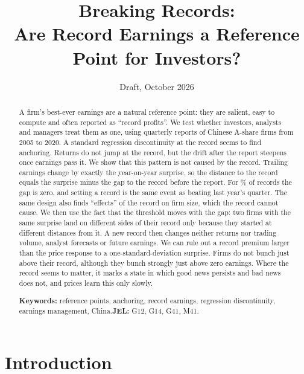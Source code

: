 \documentclass[11pt]{article}
\title{\textbf{Breaking Records:\\ Are Record Earnings a Reference Point for Investors?}}
\author{}
\date{Draft, October 2026}
\begin{document}
\maketitle
\vspace{-2em}
\begin{abstract}
\noindent A firm's best-ever earnings are a natural reference point: they are salient, easy to compute and often
reported as ``record profits''. We test whether investors, analysts and managers treat them as one, using
\NReports{} quarterly reports of Chinese A-share firms from 2005 to 2020. A standard regression discontinuity at the
record seems to find anchoring. Returns do not jump at the record, but the drift after the report steepens once
earnings pass it. We show that this pattern is not caused by the record. Trailing earnings change by exactly the
year-on-year surprise, so the distance to the record equals the surprise minus the gap to the record before the
report. For \ShareRecAtRec\% of records the gap is zero, and setting a record is the same event as beating last year's
quarter. The same design also finds ``effects'' of the record on firm size, which the record cannot cause. We then
use the fact that the threshold moves with the gap: two firms with the same surprise land on different sides of their
record only because they started at different distances from it. A new record then changes neither returns nor
trading volume, analyst forecasts or future earnings. We can rule out a record premium larger than the price response
to a one-standard-deviation surprise. Firms do not bunch just above their record, although they bunch strongly just
above zero earnings. Where the record seems to matter, it marks a state in which good news persists and bad news does
not, and prices learn this only slowly.

\medskip\noindent\textbf{Keywords:} reference points, anchoring, record earnings, regression discontinuity, earnings
management, China.\quad \textbf{JEL:} G12, G14, G41, M41.
\end{abstract}

\section{Introduction}
\end{document}
